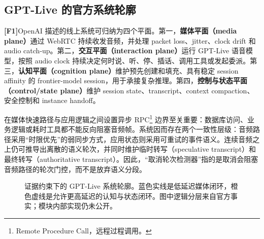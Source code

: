 \documentclass[UTF8,fontset=none,a4paper,10pt]{ctexart}
\newcommand{\FOne}{\textcolor{official}{\textbf{[F1]}}}
\begin{document}
\subsection{GPT-Live 的官方系统轮廓}

\FOne OpenAI 描述的线上系统可归纳为四个平面。第一，\textbf{媒体平面（media plane）}通过 WebRTC 持续收发音频，并处理 packet loss、jitter、clock drift 和 audio catch-up。第二，\textbf{交互平面（interaction plane）}运行 GPT-Live 语音模型，按照 audio clock 持续决定何时说、听、停、插话、调用工具或发起委派。第三，\textbf{认知平面（cognition plane）}维护预先创建和填充、具有稳定 session affinity 的 frontier-model session，用于承接复杂推理。第四，\textbf{控制与状态平面（control/state plane）}维护 session state、transcript、context compaction、安全控制和 instance handoff\cite{zh:openai2026continuous,zh:openai2026safety}。

在媒体快速路径与应用逻辑之间设置异步 RPC\footnote{Remote Procedure Call，远程过程调用。} 边界至关重要：数据库访问、业务逻辑或耗时工具都不能反向阻塞音频帧。系统因而存在两个一致性层级：音频路径采用“时限优先”的弱同步方式，应用状态则采用可重试的事件语义。连续音频之上仍可推导出离散的语义轮次，并同时维护临时转写（speculative transcript）和最终转写（authoritative transcript）。因此，“取消轮次检测器”指的是取消会阻塞音频路径的轮次门控，而不是放弃语义分段。

\begin{figure}[H]
\centering
{}
\caption{证据约束下的 GPT-Live 系统轮廓。蓝色实线是低延迟媒体闭环，橙色虚线是允许更高延迟的认知与状态闭环。图中逻辑分层来自官方事实；模块内部实现仍未公开。}
\label{zh:fig:official-architecture}
\end{figure}
\end{document}
